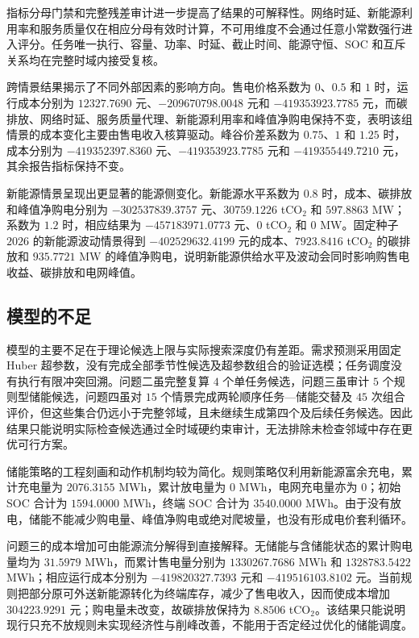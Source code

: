 \documentclass[withoutpreface,bwprint]{cumcmthesis}
\begin{document}
指标分母门禁和完整残差审计进一步提高了结果的可解释性。网络时延、新能源利用率和服务质量仅在相应分母有效时计算，不可用维度不会通过任意小常数强行进入评分。任务唯一执行、容量、功率、时延、截止时间、能源守恒、SOC 和互斥关系均在完整时域内接受复核。

跨情景结果揭示了不同外部因素的影响方向。售电价格系数为 $0$、$0.5$ 和 $1$ 时，运行成本分别为 $12327.7690$ 元、$-209670798.0048$ 元和 $-419353923.7785$ 元，而碳排放、网络时延、服务质量代理、新能源利用率和峰值净购电保持不变，表明该组情景的成本变化主要由售电收入核算驱动。峰谷价差系数为 $0.75$、$1$ 和 $1.25$ 时，成本分别为 $-419352397.8360$ 元、$-419353923.7785$ 元和 $-419355449.7210$ 元，其余报告指标保持不变。

新能源情景呈现出更显著的能源侧变化。新能源水平系数为 $0.8$ 时，成本、碳排放和峰值净购电分别为 $-302537839.3757$ 元、$30759.1226$ tCO$_2$ 和 $597.8863$ MW；系数为 $1.2$ 时，相应结果为 $-457183971.0773$ 元、$0$ tCO$_2$ 和 $0$ MW。固定种子 $2026$ 的新能源波动情景得到 $-402529632.4199$ 元的成本、$7923.8416$ tCO$_2$ 的碳排放和 $935.7721$ MW 的峰值净购电，说明新能源供给水平及波动会同时影响购售电收益、碳排放和电网峰值。

\subsection{模型的不足}

模型的主要不足在于理论候选上限与实际搜索深度仍有差距。需求预测采用固定 Huber 超参数，没有完成全部季节性候选及超参数组合的验证选模；任务调度没有执行有限冲突回溯。问题二虽完整复算 $4$ 个单任务候选，问题三虽审计 $5$ 个规则型储能候选，问题四虽对 $15$ 个情景完成两轮顺序任务—储能交替及 $45$ 次组合评价，但这些集合仍远小于完整邻域，且未继续生成第四个及后续任务候选。因此结果只能说明实际检查候选通过全时域硬约束审计，无法排除未检查邻域中存在更优可行方案。

储能策略的工程刻画和动作机制均较为简化。规则策略仅利用新能源富余充电，累计充电量为 $2076.3155$ MWh，累计放电量为 $0$ MWh，电网充电量亦为 $0$；初始 SOC 合计为 $1594.0000$ MWh，终端 SOC 合计为 $3540.0000$ MWh。由于没有放电，储能不能减少购电量、峰值净购电或绝对爬坡量，也没有形成电价套利循环。

问题三的成本增加可由能源流分解得到直接解释。无储能与含储能状态的累计购电量均为 $31.5979$ MWh，而累计售电量分别为 $1330267.7686$ MWh 和 $1328783.5422$ MWh；相应运行成本分别为 $-419820327.7393$ 元和 $-419516103.8102$ 元。当前规则把部分原可外送新能源转化为终端库存，减少了售电收入，因而使成本增加 $304223.9291$ 元；购电量未改变，故碳排放保持为 $8.8506$ tCO$_2$。该结果只能说明现行只充不放规则未实现经济性与削峰改善，不能用于否定经过优化的储能调度。
\end{document}

